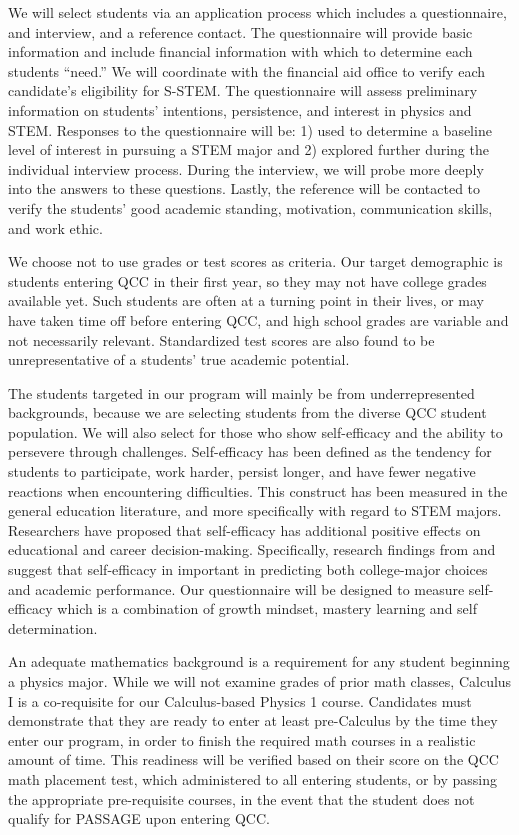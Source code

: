 \documentclass[12pt]{article}
\begin{document}
We will select students via an application process which includes a questionnaire, and interview, and a reference contact.  The questionnaire will provide basic information and include financial information with which to determine each students ``need.''  We will coordinate with the financial aid office to verify each candidate's eligibility for S-STEM.  The questionnaire will assess preliminary information on students' intentions, persistence, and interest in physics and STEM. Responses to the questionnaire will be: 1) used to determine a baseline level of interest in pursuing a STEM major and 2) explored further during the individual interview process.  During the interview, we will probe more deeply into the answers to these questions.  Lastly, the reference will be contacted to verify the students' good academic standing, motivation, communication skills, and work ethic.

We choose not to use grades or test scores as criteria.  Our target demographic is students entering QCC in their first year, so they may not have college grades available yet.  Such students are often at a turning point in their lives, or may have taken time off before entering QCC, and high school grades are variable and not necessarily relevant.  Standardized test scores are also found to be unrepresentative of a students' true academic potential.

The students targeted in our program will mainly be from underrepresented backgrounds, because we are selecting students from the diverse QCC  student population.  We will also select for those who show self-efficacy and the ability to persevere through challenges.  Self-efficacy has been defined as the tendency for students to participate, work harder, persist longer, and have fewer negative reactions when encountering difficulties.  This construct has been measured in the general education literature, and more specifically with regard to STEM majors. Researchers have proposed that self-efficacy has additional positive effects on educational and career decision-making.  Specifically, research findings from  \cite{LentHackett}  and \cite{Multon1991} suggest that self-efficacy in important in predicting both college-major choices and academic performance. Our questionnaire will be designed to measure self-efficacy which is a combination of growth mindset, mastery learning and self determination.   

An adequate mathematics background is a requirement for any student beginning a physics major.  While we will not examine grades of prior math classes, Calculus I is a co-requisite for our Calculus-based Physics 1 course.  Candidates must demonstrate that they are ready to enter at least pre-Calculus by the time they enter our program, in order to finish the required math courses in a realistic amount of time.  This readiness will be verified based on their score on the QCC math placement test, which administered to all entering students, or by passing the appropriate pre-requisite courses, in the event that the student does not qualify for PASSAGE upon entering QCC. 
\end{document}
